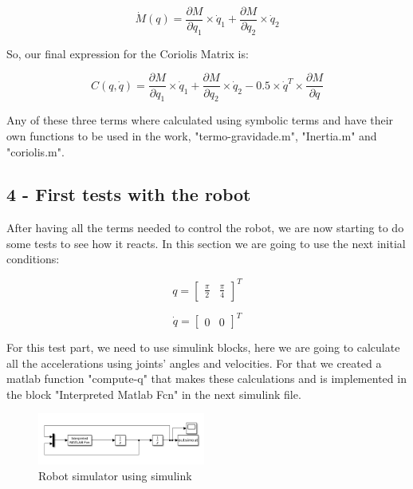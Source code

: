 \begin{equation}
    \dot{M}(q) = \frac{\partial M}{\partial q_1} \times \dot{q}_1 + \frac{\partial M}{\partial q_2} \times \dot{q}_2
\end{equation}

So, our final expression for the Coriolis Matrix is:

\begin{equation}
    C(q,\dot{q}) = \frac{\partial M}{\partial q_1} \times \dot{q}_1 + \frac{\partial M}{\partial q_2} \times \dot{q}_2 - 0.5 \times \dot{q}^T \times \frac{\partial M}{\partial q}
\end{equation}

Any of these three terms where calculated using symbolic terms and have their own functions to be used in the work, "termo-gravidade.m", "Inertia.m" and "coriolis.m".

\subsection{4 - First tests with the robot}

After having all the terms needed to control the robot, we are now starting to do some tests to see how it reacts. In this section we are going to use the next initial conditions:

\begin{equation}
    q = \begin{bmatrix}
        \frac{\pi}{2} & \frac{\pi}{4}
    \end{bmatrix}^T
\end{equation}

\begin{equation}
    \dot{q} = \begin{bmatrix}
        0 & 0
    \end{bmatrix}^T
\end{equation}

For this test part, we need to use simulink blocks, here we are going to calculate all the accelerations using joints’ angles and velocities. For that we created a matlab function "compute-q" that makes these calculations and is implemented in the block "Interpreted Matlab Fcn" in the next simulink file.

\begin{figure}[H]
    \centering
    \includegraphics[width=0.49\textwidth]{imgs/5.png}
    \caption{Robot simulator using simulink}
    \label{fig:4.1}
\end{figure}

